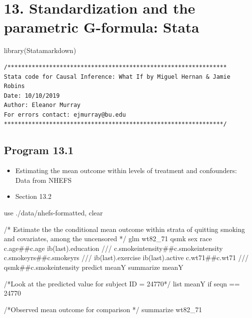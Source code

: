 \documentclass[
  10pt,
  a4paper,
]{book}
\newenvironment{Shaded}{\begin{snugshade}}{\end{snugshade}}
\newcommand{\CommentTok}[1]{\textcolor[rgb]{0.37,0.37,0.37}{#1}}
\newcommand{\FunctionTok}[1]{\textcolor[rgb]{0.28,0.35,0.67}{#1}}
\newcommand{\KeywordTok}[1]{\textcolor[rgb]{0.00,0.46,0.62}{#1}}
\newcommand{\NormalTok}[1]{\textcolor[rgb]{0.00,0.46,0.62}{#1}}
\newcommand{\OtherTok}[1]{\textcolor[rgb]{0.00,0.46,0.62}{#1}}
\providecommand{\tightlist}{%
  \setlength{\itemsep}{0pt}\setlength{\parskip}{0pt}}
\begin{document}
\hypertarget{standardization-and-the-parametric-g-formula-stata}{%
\chapter*{13. Standardization and the parametric G-formula: Stata}\label{standardization-and-the-parametric-g-formula-stata}}

\begin{Shaded}
\begin{Highlighting}[]
\FunctionTok{library}\NormalTok{(Statamarkdown)}
\end{Highlighting}
\end{Shaded}

\begin{verbatim}
/***************************************************************
Stata code for Causal Inference: What If by Miguel Hernan & Jamie Robins
Date: 10/10/2019
Author: Eleanor Murray 
For errors contact: ejmurray@bu.edu
***************************************************************/
\end{verbatim}

\hypertarget{program-13.1-1}{%
\section{Program 13.1}\label{program-13.1-1}}

\begin{itemize}
\tightlist
\item
  Estimating the mean outcome within levels of treatment and confounders: Data from NHEFS
\item
  Section 13.2
\end{itemize}

\begin{Shaded}
\begin{Highlighting}[]
\KeywordTok{use}\NormalTok{ ./}\KeywordTok{data}\NormalTok{/nhefs{-}formatted, }\KeywordTok{clear}

\CommentTok{/* Estimate the the conditional mean outcome within strata of quitting }
\CommentTok{smoking and covariates, among the uncensored */}
\KeywordTok{glm}\NormalTok{ wt82\_71 qsmk sex race c.age\#\#c.age ib(}\FunctionTok{last}\NormalTok{).education }\CommentTok{///}
\NormalTok{  c.smokeintensity\#\#c.smokeintensity c.smokeyrs\#\#c.smokeyrs }\CommentTok{///}
\NormalTok{  ib(}\FunctionTok{last}\NormalTok{).exercise ib(}\FunctionTok{last}\NormalTok{).active c.wt71\#\#c.wt71 }\CommentTok{///}
\NormalTok{  qsmk\#\#c.smokeintensity}
\KeywordTok{predict}\NormalTok{ meanY}
\KeywordTok{summarize}\NormalTok{ meanY}

\CommentTok{/*Look at the predicted value for subject ID = 24770*/}
\OtherTok{list}\NormalTok{ meanY }\KeywordTok{if}\NormalTok{ seqn == 24770}

\CommentTok{/*Observed mean outcome for comparison */}
\KeywordTok{summarize}\NormalTok{ wt82\_71}
\end{Highlighting}
\end{Shaded}
\end{document}

